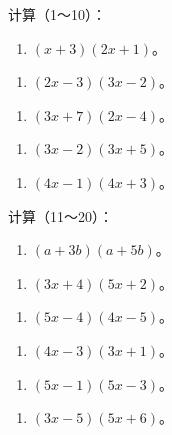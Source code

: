 计算（1～10）：

\begin{enumerate}[start=1]
\item
  \((x + 3)(2x + 1)\)。
\end{enumerate}

\begin{enumerate}[start=3]
\item
  \((2x - 3)(3x - 2)\)。
\end{enumerate}

\begin{enumerate}[start=5]
\item
  \((3x + 7)(2x - 4)\)。
\end{enumerate}

\begin{enumerate}[start=7]
\item
  \((3x - 2)(3x + 5)\)。
\end{enumerate}

\begin{enumerate}[start=9]
\item
  \((4x - 1)(4x + 3)\)。
\end{enumerate}

计算（11～20）：

\begin{enumerate}[start=11]
\item
  \((a + 3b)(a + 5b)\)。
\end{enumerate}

\begin{enumerate}[start=2]
\item
  \((3x + 4)(5x + 2)\)。
\end{enumerate}

\begin{enumerate}[start=4]
\item
  \((5x - 4)(4x - 5)\)。
\end{enumerate}

\begin{enumerate}[start=6]
\item
  \((4x - 3)(3x + 1)\)。
\end{enumerate}

\begin{enumerate}[start=8]
\item
  \((5x - 1)(5x - 3)\)。
\end{enumerate}

\begin{enumerate}[start=10]
\item
  \((3x - 5)(5x + 6)\)。
\end{enumerate}

